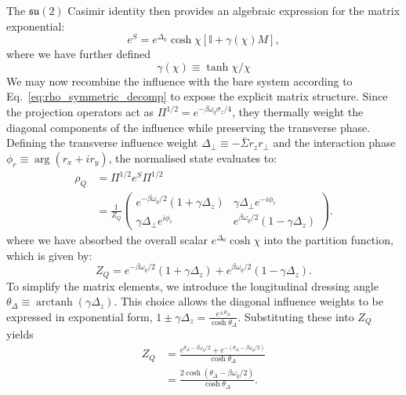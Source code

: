 The $\mathfrak{su}(2)$ Casimir identity then provides an algebraic expression for the matrix exponential:
\begin{equation}
    e^S = e^{\Delta_0} \cosh\chi \left[ \mathbb{I} + \gamma(\chi) M \right],
    \label{eq:expS_general}
\end{equation}
where we have further defined 
\begin{equation}
    \gamma(\chi) \equiv \tanh\chi / \chi
\end{equation}
We may now recombine the influence with the bare system according to Eq.~\eqref{eq:rho_symmetric_decomp} to expose the explicit matrix structure. Since the projection operators act as $\Pi^{1/2} = e^{-\beta\omega_q\sigma_z/4}$, they thermally weight the diagonal components of the influence while preserving the transverse phase. Defining the transverse influence weight $\Delta_\perp \equiv - \bar{\Sigma} r_z r_\perp$ and the interaction phase $\phi_r \equiv \operatorname{arg}(r_x + i r_y)$, the normalised state evaluates to:
\begin{equation}
    \begin{split}
        \rho_Q &= \Pi^{1/2} e^S \Pi^{1/2} \\
        &= \frac{1}{Z_Q}\begin{pmatrix}
            e^{-\beta\omega_q/2}(1+\gamma \Delta_z) & \gamma \Delta_\perp e^{-i\phi_r} \\
            \gamma \Delta_\perp e^{i\phi_r} & e^{\beta\omega_q/2}(1-\gamma \Delta_z)
        \end{pmatrix}.
    \end{split}
\end{equation}
where we have absorbed the overall scalar $e^{\Delta_0} \cosh\chi$ into the partition function, which is given by:
\begin{equation}
        Z_Q = e^{-\beta\omega_q/2}(1+\gamma \Delta_z) + e^{\beta\omega_q/2}(1-\gamma \Delta_z).
\end{equation}
To simplify the matrix elements, we introduce the longitudinal dressing angle $\theta_\Delta \equiv \operatorname{arctanh}(\gamma \Delta_z)$. This choice allows the diagonal influence weights to be expressed in exponential form, $1 \pm \gamma \Delta_z = \frac{e^{\pm\theta_\Delta}}{\cosh\theta_\Delta}$. Substituting these into $Z_Q$ yields
\begin{equation}
    \begin{split}
        Z_Q &= \frac{e^{\theta_\Delta - \beta\omega_q/2} + e^{-(\theta_\Delta - \beta\omega_q/2)}}{\cosh\theta_\Delta} \\
        &= \frac{2 \cosh(\theta_\Delta - \beta\omega_q/2)}{\cosh\theta_\Delta}.
    \end{split}
    \label{eq:partition_function_general}
\end{equation}

